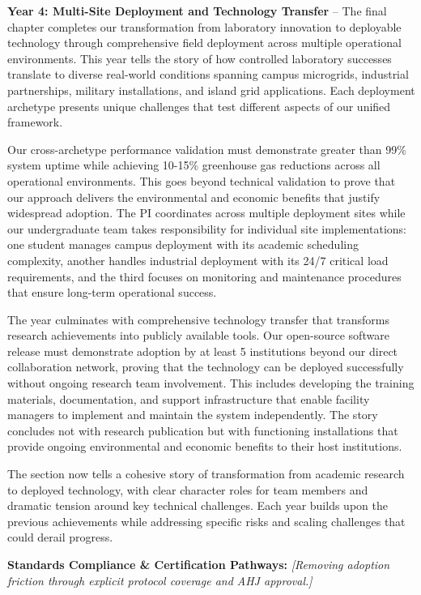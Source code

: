 \documentclass[12pt]{article}
\begin{document}
\textbf{Year 4: Multi-Site Deployment and Technology Transfer} – The final chapter completes our transformation from laboratory innovation to deployable technology through comprehensive field deployment across multiple operational environments. This year tells the story of how controlled laboratory successes translate to diverse real-world conditions spanning campus microgrids, industrial partnerships, military installations, and island grid applications. Each deployment archetype presents unique challenges that test different aspects of our unified framework.

Our cross-archetype performance validation must demonstrate greater than 99\% system uptime while achieving 10-15\% greenhouse gas reductions across all operational environments. This goes beyond technical validation to prove that our approach delivers the environmental and economic benefits that justify widespread adoption. The PI coordinates across multiple deployment sites while our undergraduate team takes responsibility for individual site implementations: one student manages campus deployment with its academic scheduling complexity, another handles industrial deployment with its 24/7 critical load requirements, and the third focuses on monitoring and maintenance procedures that ensure long-term operational success.

The year culminates with comprehensive technology transfer that transforms research achievements into publicly available tools. Our open-source software release must demonstrate adoption by at least 5 institutions beyond our direct collaboration network, proving that the technology can be deployed successfully without ongoing research team involvement. This includes developing the training materials, documentation, and support infrastructure that enable facility managers to implement and maintain the system independently. The story concludes not with research publication but with functioning installations that provide ongoing environmental and economic benefits to their host institutions.

The section now tells a cohesive story of transformation from academic research to deployed technology, with clear character roles for team members and dramatic tension around key technical challenges. Each year builds upon the previous achievements while addressing specific risks and scaling challenges that could derail progress.

\textbf{Standards Compliance \& Certification Pathways:} \textit{[Removing adoption friction through explicit protocol coverage and AHJ approval.]} 
\end{document}

